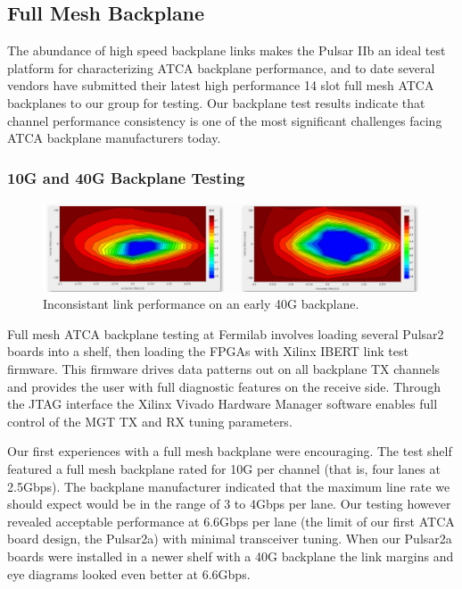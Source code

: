 \documentclass[letterpaper]{article}
\begin{document}
\subsection{Full Mesh Backplane}

The abundance of high speed backplane links makes the Pulsar IIb an ideal test platform for characterizing ATCA backplane performance, and to date several vendors have submitted their latest high performance 14 slot full mesh ATCA backplanes to our group for testing.  Our backplane test results indicate that channel performance consistency is one of the most significant challenges facing ATCA backplane manufacturers today.  

\subsubsection{10G and 40G Backplane Testing}
\label{link_perf_40g}

\begin{figure}
\centering
\includegraphics[width=12cm]{bad_links.png}
\caption{Inconsistant link performance on an early 40G backplane.}
\label{bad_links}
\end{figure}

Full mesh ATCA backplane testing at Fermilab involves loading several Pulsar2 boards into a shelf, then loading the FPGAs with Xilinx IBERT link test firmware.  This firmware drives data patterns out on all backplane TX channels and provides the user with full diagnostic features on the receive side.  Through the JTAG interface the Xilinx Vivado Hardware Manager software enables full control of the MGT TX and RX tuning parameters.

Our first experiences with a full mesh backplane were encouraging.  The test shelf featured a full mesh backplane  rated for 10G per channel (that is, four lanes at 2.5Gbps).  The backplane manufacturer indicated that the maximum line rate we should expect would be in the range of 3 to 4Gbps per lane.  Our testing however revealed acceptable performance at 6.6Gbps per lane (the limit of our first ATCA board design, the Pulsar2a) with minimal transceiver tuning.  When our Pulsar2a boards were installed in a newer shelf with a 40G backplane the link margins and eye diagrams looked even better at 6.6Gbps.
\end{document}
